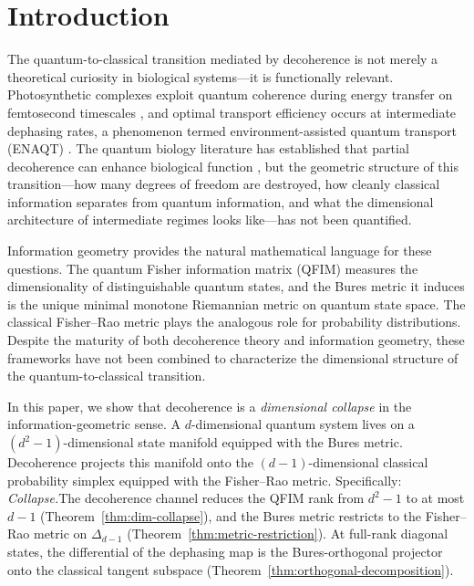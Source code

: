 \documentclass[12pt,a4paper]{article}
\theoremstyle{definition}
\theoremstyle{remark}
\begin{document}
\section{Introduction}
\label{sec:intro}

The quantum-to-classical transition mediated by decoherence \cite{zeh1970interpretation,zurek1981pointer,zurek2003decoherence,schlosshauer2005decoherence} is not merely a theoretical curiosity in biological systems---it is functionally relevant. Photosynthetic complexes exploit quantum coherence during energy transfer on femtosecond timescales \cite{engel2007evidence}, and optimal transport efficiency occurs at intermediate dephasing rates, a phenomenon termed environment-assisted quantum transport (ENAQT) \cite{plenio2008dephasing,rebentrost2009environment,mohseni2008environment}. The quantum biology literature has established that partial decoherence can enhance biological function \cite{cao2020quantum}, but the geometric structure of this transition---how many degrees of freedom are destroyed, how cleanly classical information separates from quantum information, and what the dimensional architecture of intermediate regimes looks like---has not been quantified.

Information geometry provides the natural mathematical language for these questions. The quantum Fisher information matrix (QFIM) \cite{liu2020quantum,braunstein1994statistical} measures the dimensionality of distinguishable quantum states, and the Bures metric it induces \cite{bures1969extension,uhlmann1976transition,petz1996monotone} is the unique minimal monotone Riemannian metric on quantum state space. The classical Fisher--Rao metric \cite{rao1945information,chentsov1982statistical,amari1985differential} plays the analogous role for probability distributions. Despite the maturity of both decoherence theory and information geometry, these frameworks have not been combined to characterize the dimensional structure of the quantum-to-classical transition.

In this paper, we show that decoherence is a \emph{dimensional collapse} in the information-geometric sense. A $d$-dimensional quantum system lives on a $(d^2{-}1)$-dimensional state manifold equipped with the Bures metric. Decoherence projects this manifold onto the $(d{-}1)$-dimensional classical probability simplex equipped with the Fisher--Rao metric. Specifically:
\medskip\noindent\emph{Collapse.}\quad The decoherence channel reduces the QFIM rank from $d^2{-}1$ to at most $d{-}1$ (Theorem~\ref{thm:dim-collapse}), and the Bures metric restricts to the Fisher--Rao metric on $\Delta_{d-1}$ (Theorem~\ref{thm:metric-restriction}). At full-rank diagonal states, the differential of the dephasing map is the Bures-orthogonal projector onto the classical tangent subspace (Theorem~\ref{thm:orthogonal-decomposition}).
\end{document}
